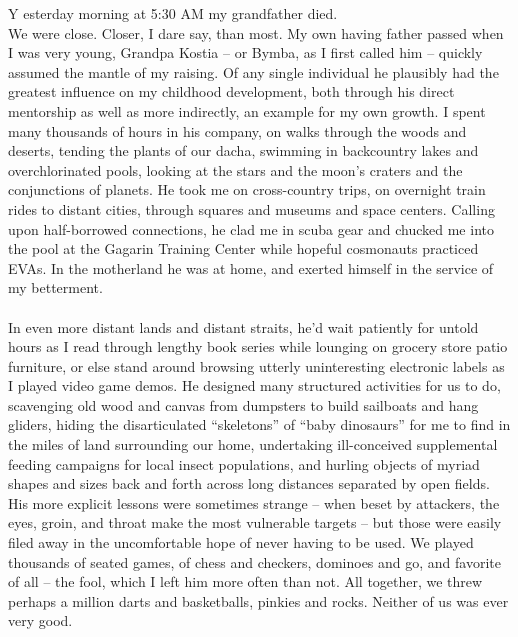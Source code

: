 \documentclass[twoside,10pt]{article}
\begin{document}
\begin{article*}
\lettrine{Y}{} esterday morning at 5:30 AM my grandfather died. 
\\
We were close. Closer, I dare say, than most. My own having father passed when I was very young, Grandpa Kostia – or Bymba, as I first called him – quickly assumed the mantle of my raising. Of any single individual he plausibly had the greatest influence on my childhood development, both through his direct mentorship as well as more indirectly, an example for my own growth. I spent many thousands of hours in his company, on walks through the woods and deserts, tending the plants of our dacha, swimming in backcountry lakes and overchlorinated pools, looking at the stars and the moon’s craters and the conjunctions of planets. He took me on cross-country trips, on overnight train rides to distant cities, through squares and museums and space centers. Calling upon half-borrowed connections, he clad me in scuba gear and chucked me into the pool at the Gagarin Training Center while hopeful cosmonauts practiced EVAs. In the motherland he was at home, and exerted himself in the service of my betterment.
\\\\
In even more distant lands and distant straits, he’d wait patiently for untold hours as I read through lengthy book series while lounging on grocery store patio furniture, or else stand around browsing utterly uninteresting electronic labels as I played video game demos. He designed many structured activities for us to do, scavenging old wood and canvas from dumpsters to build sailboats and hang gliders, hiding the disarticulated “skeletons” of “baby dinosaurs” for me to find in the miles of land surrounding our home, undertaking ill-conceived supplemental feeding campaigns for local insect populations, and hurling objects of myriad shapes and sizes back and forth across long distances separated by open fields. His more explicit lessons were sometimes strange – when beset by attackers, the eyes, groin, and throat make the most vulnerable targets – but those were easily filed away in the uncomfortable hope of never having to be used. We played thousands of seated games, of chess and checkers, dominoes and go, and favorite of all – the fool, which I left him more often than not. All together, we threw perhaps a million darts and basketballs, pinkies and rocks. Neither of us was ever very good. 
\\\\

\end{article*}
\end{document}
